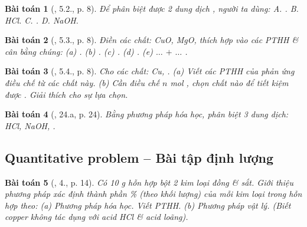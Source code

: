 \documentclass{article}
\newtheorem{baitoan}{Bài toán}
\begin{document}
\begin{baitoan}[\cite{SBT_Hoa_Hoc_9}, 5.2., p. 8]
	Để phân biệt được 2 dung dịch \emph{}, người ta dùng: {\sf A.} \emph{}. {\sf B.} \emph{HCl}. {\sf C.} \emph{}. {\sf D.} \emph{NaOH}.
\end{baitoan}

\begin{baitoan}[\cite{SBT_Hoa_Hoc_9}, 5.3., p. 8]
	Điền các chất: \emph{CuO, MgO, } thích hợp vào các PTHH \& cân bằng chúng: (a) \emph{}. (b) \emph{}. (c) \emph{}. (d) \emph{}. (e) $\ldots$ $+$ $\ldots$ \emph{}.
\end{baitoan}

\begin{baitoan}[\cite{SBT_Hoa_Hoc_9}, 5.4., p. 8]
	Cho các chất: \emph{Cu, }. (a) Viết các PTHH của phản ứng điều chế \emph{} từ các chất này. (b) Cần điều chế $n$ \emph{mol }, chọn chất nào để tiết kiệm được \emph{}. Giải thích cho sự lựa chọn.
\end{baitoan}

\begin{baitoan}[\cite{An_350_BT_Hoa_Hoc_9}, 24.a, p. 24]
	Bằng phương pháp hóa học, phân biệt 3 dung dịch: \emph{HCl, NaOH, }.
\end{baitoan}

\subsection{Quantitative problem -- Bài tập định lượng}

\begin{baitoan}[\cite{SGK_Hoa_Hoc_9}, 4., p. 14]
	Có \emph{10 g} hỗn hợp bột 2 kim loại đồng \& sắt. Giới thiệu phương pháp xác định thành phần \% (theo khối lượng) của mỗi kim loại trong hỗn hợp theo: (a) Phương pháp hóa học. Viết PTHH. (b) Phương pháp vật lý. (Biết copper không tác dụng với acid \emph{HCl} \& acid \emph{} loãng).
\end{baitoan}
\end{document}
